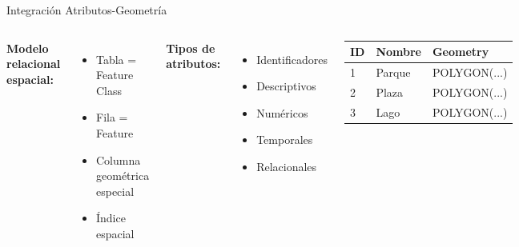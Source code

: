 \documentclass[10pt,aspectratio=169]{beamer}
\begin{document}
\begin{frame}{Integración Atributos-Geometría}
    \begin{columns}[T]
        \textbf{Modelo relacional espacial:}
        \begin{itemize}
            \item Tabla = Feature Class
            \item Fila = Feature
            \item Columna geométrica especial
            \item Índice espacial
        \end{itemize}
        
        \vspace{0.2cm}
        
        \textbf{Tipos de atributos:}
        \begin{itemize}
            \item Identificadores
            \item Descriptivos
            \item Numéricos
            \item Temporales
            \item Relacionales
        \end{itemize}
        
        \begin{center}
        \begin{table}
            \footnotesize
            \begin{tabular}{|l|l|l|}
            \hline
            \textbf{ID} & \textbf{Nombre} & \textbf{Geometry} \\
            \hline
            1 & Parque & POLYGON(...) \\
            2 & Plaza & POLYGON(...) \\
            3 & Lago & POLYGON(...) \\
            \hline
            \end{tabular}
        \end{table}
        
        \vspace{0.3cm}
        
        \end{center}
    \end{columns}
\end{frame}
\end{document}

